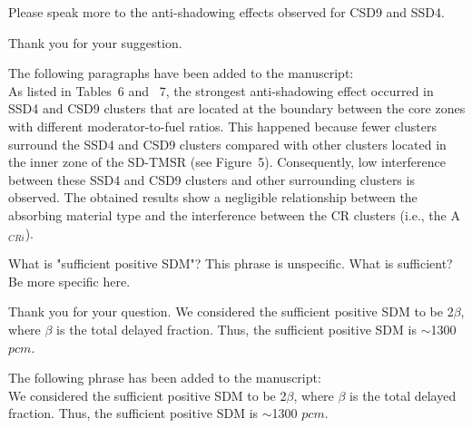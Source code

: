\documentclass[answers,11pt]{exam}
\begin{document}
\begin{questions}
\begin{solution}
        \end{solution}

\question Please speak more to the anti-shadowing effects observed for CSD9 and SSD4.
\begin{solution}
	Thank you for your suggestion. 
	
	The following paragraphs have been added to the manuscript:\\
	
	As listed in Tables~6 and ~7, the strongest anti-shadowing effect occurred in 
	SSD4 and CSD9 clusters that are located at the boundary between the core zones 
	with different moderator-to-fuel ratios. This happened because fewer clusters surround the SSD4 and CSD9 clusters compared with other clusters located in the inner zone of the SD-TMSR (see Figure~5). Consequently, low interference between these SSD4 and CSD9 clusters and other surrounding clusters is observed. The obtained results show a negligible relationship between the absorbing material type and the interference between the CR clusters (i.e., the A$_{CRi}$).
	

\end{solution}
\question What is "sufficient positive SDM"? This phrase is unspecific. What is sufficient? Be more specific here.
\begin{solution}
	Thank you for your question. We considered the sufficient positive SDM to be 2$\beta$, where $\beta$ is the total delayed fraction. Thus, the sufficient positive SDM is $\sim$1300 $pcm$.
	
	The following phrase has been added to the manuscript:\\
	
	We considered the sufficient positive SDM to be 2$\beta$, where $\beta$ is the total delayed fraction. Thus, the sufficient positive SDM is $\sim$1300 $pcm$.
	
	

\end{solution}

        
        
\end{questions}


\end{document}
